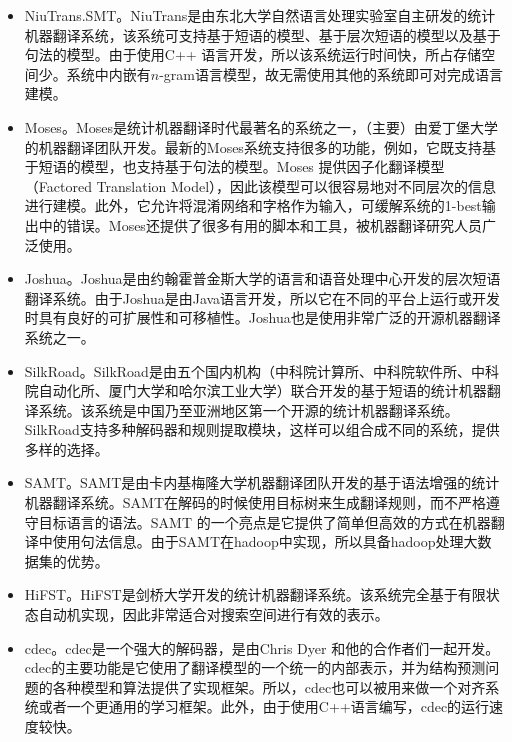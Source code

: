 \begin{appendices}
\begin{itemize}
\vspace{0.5em}
\item NiuTrans.SMT。NiuTrans是由东北大学自然语言处理实验室自主研发的统计机器翻译系统，该系统可支持基于短语的模型、基于层次短语的模型以及基于句法的模型。由于使用C++ 语言开发，所以该系统运行时间快，所占存储空间少。系统中内嵌有$n$-gram语言模型，故无需使用其他的系统即可对完成语言建模。
\vspace{0.5em}
\item Moses。Moses是统计机器翻译时代最著名的系统之一，（主要）由爱丁堡大学的机器翻译团队开发。最新的Moses系统支持很多的功能，例如，它既支持基于短语的模型，也支持基于句法的模型。Moses 提供因子化翻译模型（Factored Translation Model），因此该模型可以很容易地对不同层次的信息进行建模。此外，它允许将混淆网络和字格作为输入，可缓解系统的1-best输出中的错误。Moses还提供了很多有用的脚本和工具，被机器翻译研究人员广泛使用。
\vspace{0.5em}
\item Joshua。Joshua是由约翰霍普金斯大学的语言和语音处理中心开发的层次短语翻译系统。由于Joshua是由Java语言开发，所以它在不同的平台上运行或开发时具有良好的可扩展性和可移植性。Joshua也是使用非常广泛的开源机器翻译系统之一。
\vspace{0.5em}
\item SilkRoad。SilkRoad是由五个国内机构（中科院计算所、中科院软件所、中科院自动化所、厦门大学和哈尔滨工业大学）联合开发的基于短语的统计机器翻译系统。该系统是中国乃至亚洲地区第一个开源的统计机器翻译系统。SilkRoad支持多种解码器和规则提取模块，这样可以组合成不同的系统，提供多样的选择。
\vspace{0.5em}
\item SAMT。SAMT是由卡内基梅隆大学机器翻译团队开发的基于语法增强的统计机器翻译系统。SAMT在解码的时候使用目标树来生成翻译规则，而不严格遵守目标语言的语法。SAMT 的一个亮点是它提供了简单但高效的方式在机器翻译中使用句法信息。由于SAMT在hadoop中实现，所以具备hadoop处理大数据集的优势。
\vspace{0.5em}
\item HiFST。HiFST是剑桥大学开发的统计机器翻译系统。该系统完全基于有限状态自动机实现，因此非常适合对搜索空间进行有效的表示。
\vspace{0.5em}
\item cdec。cdec是一个强大的解码器，是由Chris Dyer 和他的合作者们一起开发。cdec的主要功能是它使用了翻译模型的一个统一的内部表示，并为结构预测问题的各种模型和算法提供了实现框架。所以，cdec也可以被用来做一个对齐系统或者一个更通用的学习框架。此外，由于使用C++语言编写，cdec的运行速度较快。

\end{itemize}
\end{appendices}
